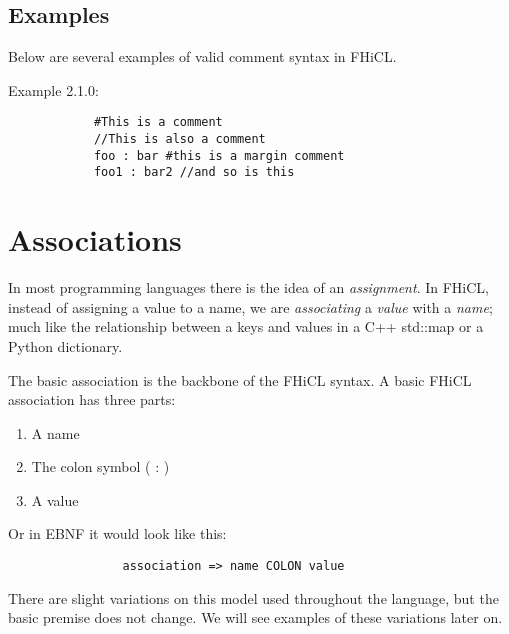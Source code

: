 \documentclass{memarticle}
\begin{document}
	\section{Examples}
		Below are several examples of valid comment syntax in FHiCL.
		\par
		Example 2.1.0:
		\begin{verbatim}
			#This is a comment
			//This is also a comment
			foo : bar #this is a margin comment
			foo1 : bar2 //and so is this
		\end{verbatim}
\chapter{Associations}
        In most programming languages there is the idea of an \emph{assignment}.
        In FHiCL,  instead of assigning a value to a name,
        we are \emph{associating} a \emph{value} with a \emph{name};
        much like the relationship between a keys and values in a C++ std::map or a Python dictionary.
        \par
        The basic association is the backbone of the FHiCL syntax.
        A basic FHiCL association has three parts:
        \begin{enumerate}
                \item A name
                \item The colon symbol ( : )
                \item A value
        \end{enumerate}
        \par
        Or in EBNF it would look like this:
        \begin{verbatim}
                association => name COLON value
        \end{verbatim}
        \par
        There are slight variations on this model used throughout the language,
        but the basic premise does not change.
        We will see examples of these variations later on.
\end{document}

